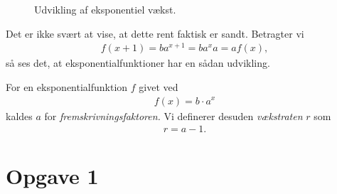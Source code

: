 \documentclass[12pt]{article}
\begin{document}
\begin{figure}[H]
\center
{}
\caption{Udvikling af eksponentiel vækst.}
\label{fig:sildegen}
\end{figure}
Det er ikke svært at vise, at dette rent faktisk er sandt. Betragter vi
\begin{align*}
f(x+1) = ba^{x+1} = ba^xa = af(x),
\end{align*}
så ses det, at eksponentialfunktioner har en sådan udvikling. 
\begin{defn}
	For en eksponentialfunktion $f$ givet ved
	\begin{align*}
		f(x) = b\cdot a^x
	\end{align*}
	kaldes $a$ for \textit{fremskrivningsfaktoren.}
	Vi definerer desuden \textit{vækstraten} $r$ som
	\begin{align*}
		r = a -1.
	\end{align*}
\end{defn}

\section*{Opgave 1}
\end{document}
